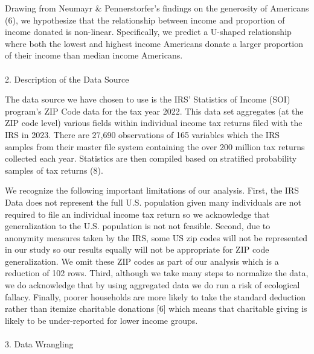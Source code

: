 \documentclass[
  letterpaper,
  DIV=11,
  numbers=noendperiod]{scrartcl}
\makeatletter
\let\oldparagraph\paragraph
\renewcommand{\paragraph}{
    \@ifstar
      \xxxParagraphStar
      \xxxParagraphNoStar
  }
\newcommand{\xxxParagraphStar}[1]{\oldparagraph*{#1}\mbox{}}
\newcommand{\xxxParagraphNoStar}[1]{\oldparagraph{#1}\mbox{}}
\makeatother
\begin{document}
Drawing from Neumayr \& Pennerstorfer's findings on the generosity of
Americans (6), we hypothesize that the relationship between income and
proportion of income donated is non-linear. Specifically, we predict a
U-shaped relationship where both the lowest and highest income Americans
donate a larger proportion of their income than median income Americans.

\paragraph{2. Description of the Data
Source}\label{description-of-the-data-source}

The data source we have chosen to use is the IRS' Statistics of Income
(SOI) program's ZIP Code data for the tax year 2022. This data set
aggregates (at the ZIP code level) various fields within individual
income tax returns filed with the IRS in 2023. There are 27,690
observations of 165 variables which the IRS samples from their master
file system containing the over 200 million tax returns collected each
year. Statistics are then compiled based on stratified probability
samples of tax returns (8).

We recognize the following important limitations of our analysis. First,
the IRS Data does not represent the full U.S. population given many
individuals are not required to file an individual income tax return so
we acknowledge that generalization to the U.S. population is not not
feasible. Second, due to anonymity measures taken by the IRS, some US
zip codes will not be represented in our study so our results equally
will not be appropriate for ZIP code generalization. We omit these ZIP
codes as part of our analysis which is a reduction of 102 rows. Third,
although we take many steps to normalize the data, we do acknowledge
that by using aggregated data we do run a risk of ecological fallacy.
Finally, poorer households are more likely to take the standard
deduction rather than itemize charitable donations {[}6{]} which means
that charitable giving is likely to be under-reported for lower income
groups.

\paragraph{3. Data Wrangling}\label{data-wrangling}
\end{document}
